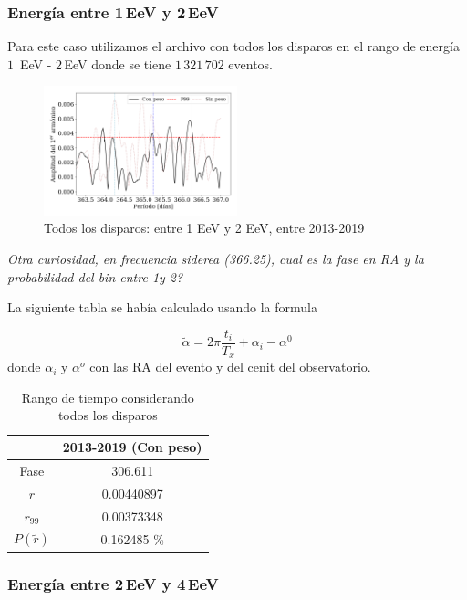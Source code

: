 \subsubsection{Energía entre 1\,EeV y 2\,EeV}

Para este caso utilizamos el archivo con todos los disparos en el rango de energía $1\,$ EeV - $2\,$EeV donde se tiene $1\,321\,702$ eventos.

\begin{figure}[H]
	\centering
	\includegraphics[width=0.5\textwidth]{2019_AllTriggers_1_2_EeV_con_vs_sin_peso.png}
	\caption{Todos los disparos: entre 1 EeV y 2 EeV, entre 2013-2019}
	\label{fig:12w}
\end{figure}

\emph{Otra curiosidad, en frecuencia siderea (366.25), cual es la fase en RA y la probabilidad del bin entre 1y 2?}

La siguiente tabla se había calculado usando la formula 

\begin{equation}
	\tilde \alpha = 2\pi \frac{t_i}{T_x} +\alpha_i - \alpha^0
\end{equation}
donde $\alpha_i$ y $\alpha^o$ con las RA del evento y del cenit del observatorio.

	\begin{table}[H]
	\centering
		\begin{tabular}{c|c}
	 		&  2013-2019 (Con peso)	 \\ \hline
	Fase		& 	306.611				 \\
	$r$ 		&  0.00440897			\\
	$r_{99}$ 	&  0.00373348			\\
	$P(\tilde r)$ 	    & 	0.162485	\%	 \\
		\end{tabular}
	\caption{Rango de tiempo considerando todos los disparos} 	\label{rango_corto}
	\end{table}


\subsubsection{Energía entre 2\,EeV y 4\,EeV}


